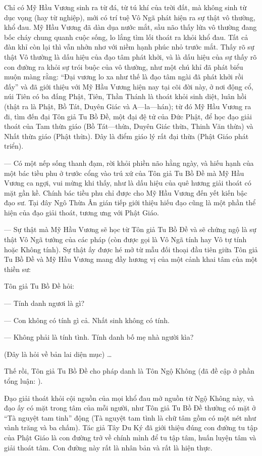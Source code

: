 Chỉ có Mỹ Hầu Vương sinh ra từ đá, từ tú khí của trời đất, mà không sinh từ dục vọng (hay từ nghiệp), mới có trí tuệ Vô Ngã phát hiện ra sự thật vô thường, khổ đau. Mỹ Hầu Vương đã dàn dụa nước mắt, sầu não thấy lửa vô thường đang bốc cháy chung quanh cuộc sống, lo lắng tìm lối thoát ra khỏi khổ đau. Tất cả đàn khỉ còn lại thì vẫn nhởn nhơ với niềm hạnh phúc nhỏ trước mắt. Thấy rõ sự thật Vô thường là dấu hiệu của đạo tâm phát khởi, và là dấu hiệu của sự thấy rõ con đường ra khỏi sự trói buộc của vô thường, như một chú khỉ đã phát biểu muộn màng rằng: ``Đại vương lo xa như thế là đạo tâm ngài đã phát khởi rồi đấy'' và đã giới thiệu với Mỹ Hầu Vương hiện nay tại cõi đời này, ở nơi động cổ, núi Tiên có ba đấng Phật, Tiên, Thần Thánh là thoát khỏi sinh diệt, luân hồi (thật ra là Phật, Bồ Tát, Duyên Giác và A—la—hán); từ đó Mỹ Hầu Vương ra đi, tìm đến đại Tôn giả Tu Bồ Đề, một đại đệ tử của Đức Phật, để học đạo giải thoát của Tam thừa giáo (Bồ Tát—thừa, Duyên Giác thừa, Thinh Văn thừa) và Nhất thừa giáo (Phật thừa). Đây là điểm giáo lý rất đại thừa (Phật Giáo phát triển).

— Có một nếp sống thanh đạm, rời khỏi phiền não hằng ngày, và hiếu hạnh của một bác tiều phu ở trước cổng vào trú xứ của Tôn giả Tu Bồ Đề mà Mỹ Hầu Vương ca ngợi, vui mừng khi thấy, như là dấu hiệu của quê hương giải thoát có mặt gần kề. Chính bác tiều phu chỉ được cho Mỹ Hầu Vương đến yết kiến bậc đạo sư. Tại đây Ngô Thừa Ân gián tiếp giới thiệu hiếu đạo cũng là một phần thể hiện của đạo giải thoát, tương ưng với Phật Giáo.

— Sự thật mà Mỹ Hầu Vương sẽ học từ Tôn giả Tu Bồ Đề và sẽ chứng ngộ là sự thật Vô Ngã tướng của các pháp (còn được gọi là Vô Ngã tính hay Vô tự tính hoặc Không tính). Sự thật ấy được hé mở từ mẫu đối thoại đầu tiên giữa Tôn giả Tu Bồ Đề và Mỹ Hầu Vương mang đầy hương vị của một cảnh khai tâm của một thiền sư:

Tôn giả Tu Bồ Đề hỏi:

— Tính danh ngươi là gì?

— Con không có tính gì cả. Nhất sinh không có tính.

— Không phải là tính tình. Tính danh bố mẹ nhà người kìa?

(Đây là hỏi về bản lai diện mục) \ldots

Thế rồi, Tôn giả Tu Bồ Đề cho pháp danh là Tôn Ngộ Không (đã đề cập ở phần tổng luận: ).

Đạo giải thoát khỏi cội nguồn của mọi khổ đau mở nguồn từ Ngộ Không này, và đạo ấy có mặt trong tâm của mỗi người, như Tôn giả Tu Bồ Đề thường có mặt ở ``Tà nguyệt tam tinh'' động (Tà nguyệt tam tình là chữ tâm gồm có một nét như vành trăng và ba chấm). Tác giả Tây Du Ký đã giới thiệu đúng con đường tu tập của Phật Giáo là con đường trở về chính mình để tu tập tâm, huấn luyện tâm và giải thoát tâm. Con đường này rất là nhân bản và rất là hiện thực.

